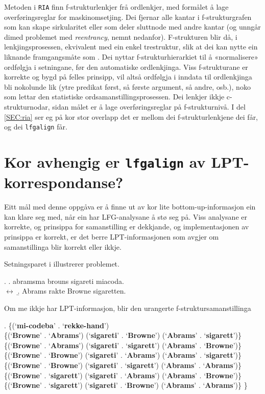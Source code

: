 \documentclass[11pt,a4paper,oneside,draft]{book}
\newcommand{\p}[1]{`\textbf{#1}'}
\begin{document}
 Metoden i \texttt{RIA} \citep{graham2009osr,graham2009fts} finn
 f-strukturlenkjer frå ordlenkjer, med formålet å lage
 overføringsreglar for maskinomsetjing. Dei fjernar alle kantar i
 f-strukturgrafen som kan skape sirkularitet eller som deler sluttnode
 med andre kantar (og unngår dimed problemet med \emph{reentrancy}, nemnt
 nedanfor). F-strukturen blir då, i lenkjingsprosessen, ekvivalent med
 ein enkel trestruktur, slik at dei kan nytte ein liknande
 framgangsmåte som \citet{samuelsson2007apa}.  Dei nyttar
 f-strukturhierarkiet til å «normalisere» ordfølgja i setningane, før
 den automatiske ordlenkjinga. Viss f-strukturane er korrekte og bygd
 på felles prinsipp, vil altså ordfølgja i inndata til ordlenkjinga
 bli nokolunde lik (ytre predikat først, så første argument, så andre,
 osb.), noko som lettar den statistiske ordsamanstillingsprosessen.
 Dei lenkjer ikkje c-strukturnodar, sidan målet er å lage
 overføringsreglar på f-strukturnivå. I del \ref{SEC:ria} ser eg på
 kor stor overlapp det er mellom dei f-strukturlenkjene dei får, og
 dei \texttt{lfgalign} får.

 
\section{Kor avhengig er \texttt{lfgalign} av LPT-korrespondanse?}
\label{sec-5.3}

 Eitt mål med denne oppgåva er å finne ut av kor lite
 bottom-up-informasjon ein kan klare seg med, når ein har
 LFG-analysane å stø seg på. Viss analysane er korrekte, og prinsippa
 for samanstilling er dekkjande, og implementasjonen av prinsippa er
 korrekt, er det berre LPT-informasjonen som avgjer om samanstillinga
 blir korrekt eller ikkje.

 Setningsparet i \Next illustrerer problemet.

\ex. \a. abramsma brouns sigareti miacoda.\\
     $\leftrightarrow$
     \b. Abrams rakte Browne sigaretten.
     
 Om me ikkje har LPT-informasjon, blir den urangerte
 f-struktursamanstillinga

\ex. \{(\p{mi-codeba} . \p{rekke-hand}) \\
 \{(\p{Browne} . \p{Abrams}) (\p{sigareti} . \p{Browne}) (\p{Abrams} . \p{sigarett})\} \\
 \{(\p{Browne} . \p{Abrams}) (\p{sigareti} . \p{sigarett}) (\p{Abrams} . \p{Browne})\} \\
 \{(\p{Browne} . \p{Browne}) (\p{sigareti} . \p{Abrams}) (\p{Abrams} . \p{sigarett})\} \\
 \{(\p{Browne} . \p{Browne}) (\p{sigareti} . \p{sigarett}) (\p{Abrams} . \p{Abrams})\} \\
 \{(\p{Browne} . \p{sigarett}) (\p{sigareti} . \p{Abrams}) (\p{Abrams} . \p{Browne})\} \\
 \{(\p{Browne} . \p{sigarett}) (\p{sigareti} . \p{Browne}) (\p{Abrams} . \p{Abrams})\} \}
\end{document}
